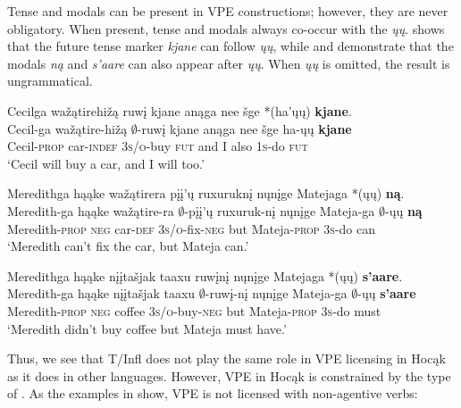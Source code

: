 \documentclass[output=paper]{LSP/langsci}
\begin{document}
Tense and modals can be present in VPE constructions; however, they are never obligatory. When present, tense and modals always co-occur with the  \emph{ųų}.  shows that the future tense marker \emph{kjane} can follow \emph{ųų}, while  and  demonstrate that the modals \emph{ną} and \emph{s'aare} can also appear after \emph{ųų}. When \emph{ųų} is omitted, the result is ungrammatical.
 
\ea\label{ex:johnson:19}
\ea\label{ex:johnson:19a} 
\glll Cecilga wažątirehižą ruwį kjane anąga nee šge *(ha'ųų) \textbf{kjane}.\\
Cecil-ga wažątire-hižą $\emptyset$-ruwį kjane anąga nee šge ha-ųų \textbf{kjane}\\
Cecil-\textsc{prop} car-\textsc{indef} \textsc{3s/o}-buy \textsc{fut} and I also \textsc{1s}-do \textsc{fut}\\
\trans `Cecil will buy a car, and I will too.' 
 
\ex\label{ex:johnson:19b} 
\glll Meredithga hąąke wažątirera {pįį'ų ruxuruknį} nųnįge Matejaga *(ųų) \textbf{ną}.\\
Meredith-ga hąąke wažątire-ra {$\emptyset$-pįį'ų ruxuruk-nį} nųnįge Mateja-ga $\emptyset$-ųų \textbf{ną}\\
Meredith-\textsc{prop} \textsc{neg} car-\textsc{def} \textsc{3s/o}-fix-\textsc{neg} but Mateja-\textsc{prop} \textsc{3s}-do can\\
\trans `Meredith can't fix the car, but Mateja can.'
 
\ex\label{ex:johnson:19c} 
\glll Meredithga hąąke {nįįtašjak taaxu} ruwįnį nųnįge Matejaga *(ųų) \textbf{s'aare}.\\ 
Meredith-ga hąąke {nįįtašjak taaxu} $\emptyset$-ruwį-nį nųnįge Mateja-ga $\emptyset$-ųų \textbf{s'aare}\\
Meredith-\textsc{prop} \textsc{neg} coffee \textsc{3s/o}-buy-\textsc{neg} but Mateja-\textsc{prop} \textsc{3s}-do must\\
\trans `Meredith didn't buy coffee but Mateja must have.' 
\z
\z
 
Thus, we see that T/Infl does not play the same role in VPE licensing in Hocąk as it does in other languages. However, VPE in Hocąk is constrained by the type of . As the examples in  show, VPE is not licensed with non-agentive verbs:
 
\end{document}
